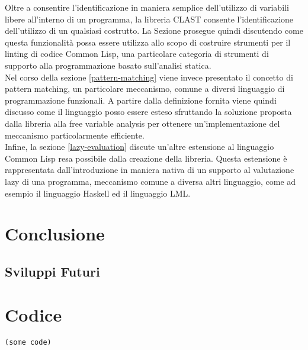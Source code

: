 \documentclass{book}
\begin{document}
Oltre a consentire l'identificazione in maniera semplice dell'utilizzo di
variabili libere all'interno di un programma, la libreria CLAST consente
l'identificazione dell'utilizzo di un qualsiasi costrutto. La Sezione prosegue
quindi discutendo come questa funzionalità possa essere utilizza allo scopo di
costruire strumenti per il linting di codice Common Lisp, una particolare
categoria di strumenti di supporto alla programmazione basato sull'analisi
statica.\\

Nel corso della sezione \ref{pattern-matching} viene invece presentato il
concetto di pattern matching, un particolare meccanismo, comune a diversi
linguaggio di programmazione funzionali. A partire dalla definizione fornita
viene quindi discusso come il linguaggio posso essere esteso sfruttando la
soluzione proposta dalla libreria alla free variable analysis per ottenere
un'implementazione del meccanismo particolarmente efficiente.\\

Infine, la sezione \ref{lazy-evaluation} discute un'altre estensione al
linguaggio Common Lisp resa possibile dalla creazione della libreria. Questa
estensione è rappresentata dall'introduzione in maniera nativa di un supporto al
valutazione lazy di una programma, meccanismo comune a diversa altri linguaggio,
come ad esempio il linguaggio Haskell ed il linguaggio LML.





\chapter{Conclusione}
\section{Sviluppi Futuri}

\appendix

\chapter{Codice}

\begin{lstlisting}
(some code)
\end{lstlisting}

\printbibliography[nottype=misc,title={Bibliografia}]
\printbibliography[type=misc,title={Sitografia}]
\end{document}
